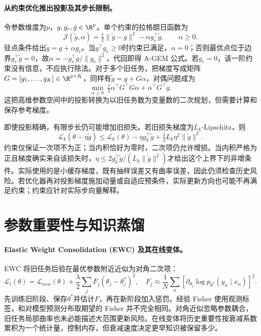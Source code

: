 \paragraph{从约束优化推出投影及其步长限制。}
令参数维度为$p$，$g,g_r,\tilde g\in\R^p$。单个约束的拉格朗日函数为
\begin{equation}
 \mathcal J(\tilde g,\alpha)=\tfrac12\|\tilde g-g\|^2-\alpha g_r^\top\tilde g,
 \qquad\alpha\geq0.
\end{equation}
驻点条件给出$\tilde g=g+\alpha g_r$。当$g^\top g_r\geq0$时约束已满足，$\alpha=0$；否则最优点位于边界$g_r^\top\tilde g=0$，故$\alpha=-g_r^\top g/\|g_r\|^2$，代回即得 A-GEM 公式。若$g_r=0$，该一阶约束没有信息，不应执行除法。对于多个旧任务，把梯度写成矩阵$G=[g_1,\ldots,g_K]\in\R^{p\times K}$，同样有$\tilde g=g+G\alpha$，对偶问题成为
\begin{equation}
 \min_{\alpha\geq0}\ \tfrac12\alpha^\top G^\top G\alpha+\alpha^\top G^\top g.
\end{equation}
这把高维参数空间中的投影转换为以旧任务数为变量数的二次规划，但需要计算和保存参考梯度。

即使投影精确，有限步长仍可能增加旧损失。若旧损失梯度为$L_k$-Lipschitz，则
\begin{equation}
 \mathcal L_k(\theta-\eta\tilde g)
 \leq\mathcal L_k(\theta)-\eta g_k^\top\tilde g
 +\tfrac12L_k\eta^2\|\tilde g\|^2.
\end{equation}
约束仅保证一次项不为正；当内积恰好为零时，二次项仍允许增损。当内积严格为正且梯度确实来自该损失时，$\eta\leq2g_k^\top\tilde g/(L_k\|\tilde g\|^2)$才给出这个上界下的非增条件。实际使用的是小缓存梯度，既有抽样误差又有曲率误差，因此仍须检查历史风险。若优化器再对投影梯度施加动量或自适应预条件，实际更新方向也可能不再满足约束；约束应针对实际步向量解释。

\section{参数重要性与知识蒸馏}
\paragraph{Elastic Weight Consolidation (EWC) 及其在线变体。}
EWC 将旧任务后验在最优参数附近近似为对角二次项\cite{kirkpatrick2017ewc}：
\begin{equation}
 \mathcal L_t(\theta)=\mathcal L_{new}(\theta)
 +\frac\lambda2\sum_jF_j(\theta_j-\theta_j^*)^2,
 \quad
 F_j\approx\frac1N\sum_n[\partial_{\theta_j}\log p_{\theta^*}(y_n\mid x_n)]^2.
\end{equation}
先训练旧阶段、保存$\theta^*$并估计$F$，再在新阶段加入惩罚。经验 Fisher 使用观测标签，和对模型预测分布取期望的 Fisher 并不完全相同。对角近似忽略参数耦合，旧任务局部曲率也未必能描述大范围更新风险。在线变体将历史重要性按衰减系数累积为一个统计量，控制内存，但衰减速度决定更早知识被保留多少。

